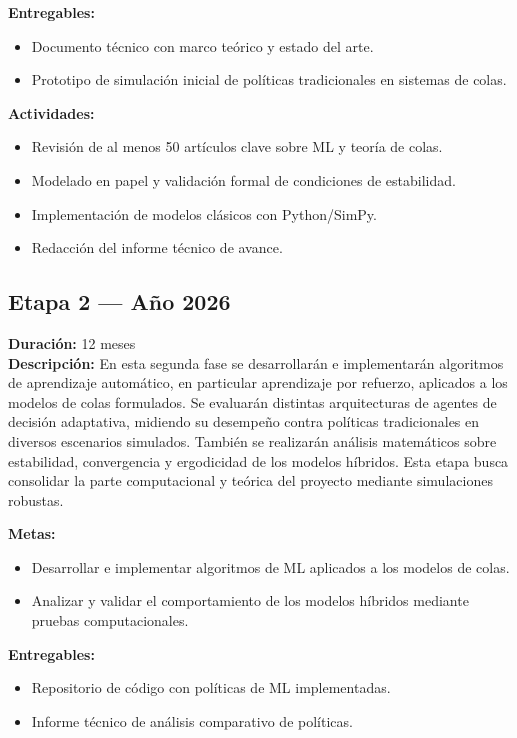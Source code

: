 \documentclass[12pt]{article}
\begin{document}
\textbf{Entregables:}
\begin{itemize}
  \item Documento técnico con marco teórico y estado del arte.
  \item Prototipo de simulación inicial de políticas tradicionales en sistemas de colas.
\end{itemize}

\textbf{Actividades:}
\begin{itemize}
  \item Revisión de al menos 50 artículos clave sobre ML y teoría de colas.
  \item Modelado en papel y validación formal de condiciones de estabilidad.
  \item Implementación de modelos clásicos con Python/SimPy.
  \item Redacción del informe técnico de avance.
\end{itemize}

\subsection*{Etapa 2 — Año 2026}
\textbf{Duración:} 12 meses\\
\textbf{Descripción:} En esta segunda fase se desarrollarán e implementarán algoritmos de aprendizaje automático, en particular aprendizaje por refuerzo, aplicados a los modelos de colas formulados. Se evaluarán distintas arquitecturas de agentes de decisión adaptativa, midiendo su desempeño contra políticas tradicionales en diversos escenarios simulados. También se realizarán análisis matemáticos sobre estabilidad, convergencia y ergodicidad de los modelos híbridos. Esta etapa busca consolidar la parte computacional y teórica del proyecto mediante simulaciones robustas.

\textbf{Metas:}
\begin{itemize}
  \item Desarrollar e implementar algoritmos de ML aplicados a los modelos de colas.
  \item Analizar y validar el comportamiento de los modelos híbridos mediante pruebas computacionales.
\end{itemize}

\textbf{Entregables:}
\begin{itemize}
  \item Repositorio de código con políticas de ML implementadas.
  \item Informe técnico de análisis comparativo de políticas.
\end{itemize}
\end{document}
